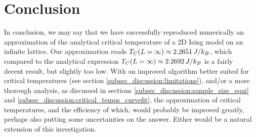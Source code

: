 \section{Conclusion}\label{sec:conclusion}

In conclusion, we may say that we have successfully reproduced numerically an approximation of the analytical critical temperature of a 2D Ising model on an infinite lattice. Our approximation reads $T_C(L=\infty) \approx 2.2651\,J/k_B$, which compared to the analytical expression $T_C(L=\infty)\approx 2.2692\,J/k_B$ is a fairly decent result, but slightly too low. With an improved algorithm better suited for critical temperatures (see section \ref{subsec_discussion:limitations}), and/or a more thorough analysis, as discussed in sections \ref{subsec_discussion:sample_size_equi} and \ref{subsec_discussion:critical_temps_curvefit}, the approximation of critical temperatures, and the efficiency of which, would probably be improved greatly, perhaps also putting some uncertainties on the answer. Either would be a natural extension of this investigation. 


